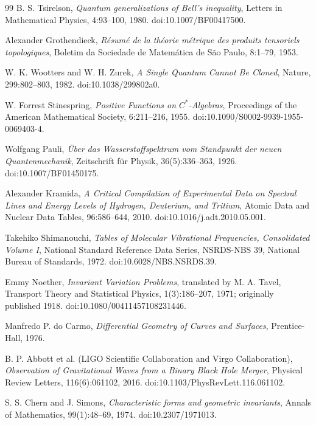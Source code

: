 \documentclass{article}
\begin{document}
\begin{thebibliography}{99}
B. S. Tsirelson,
\textit{Quantum generalizations of Bell's inequality},
Letters in Mathematical Physics, 4:93--100, 1980.
doi:10.1007/BF00417500.

Alexander Grothendieck,
\textit{R\'esum\'e de la th\'eorie m\'etrique des produits tensoriels topologiques},
Boletim da Sociedade de Matem\'atica de S\~ao Paulo, 8:1--79, 1953.

W. K. Wootters and W. H. Zurek,
\textit{A Single Quantum Cannot Be Cloned},
Nature, 299:802--803, 1982.
doi:10.1038/299802a0.

W. Forrest Stinespring,
\textit{Positive Functions on $C^*$-Algebras},
Proceedings of the American Mathematical Society, 6:211--216, 1955.
doi:10.1090/S0002-9939-1955-0069403-4.

Wolfgang Pauli,
\textit{\"Uber das Wasserstoffspektrum vom Standpunkt der neuen
Quantenmechanik},
Zeitschrift f\"ur Physik, 36(5):336--363, 1926.
doi:10.1007/BF01450175.

Alexander Kramida,
\textit{A Critical Compilation of Experimental Data on Spectral Lines and
Energy Levels of Hydrogen, Deuterium, and Tritium},
Atomic Data and Nuclear Data Tables, 96:586--644, 2010.
doi:10.1016/j.adt.2010.05.001.

Takehiko Shimanouchi,
\textit{Tables of Molecular Vibrational Frequencies, Consolidated Volume I},
National Standard Reference Data Series, NSRDS-NBS 39,
National Bureau of Standards, 1972.
doi:10.6028/NBS.NSRDS.39.

Emmy Noether,
\textit{Invariant Variation Problems},
translated by M. A. Tavel,
Transport Theory and Statistical Physics, 1(3):186--207, 1971;
originally published 1918.
doi:10.1080/00411457108231446.

Manfredo P. do Carmo,
\textit{Differential Geometry of Curves and Surfaces},
Prentice-Hall, 1976.

B. P. Abbott et al. (LIGO Scientific Collaboration and Virgo Collaboration),
\textit{Observation of Gravitational Waves from a Binary Black Hole Merger},
Physical Review Letters, 116(6):061102, 2016.
doi:10.1103/PhysRevLett.116.061102.

S. S. Chern and J. Simons,
\textit{Characteristic forms and geometric invariants},
Annals of Mathematics, 99(1):48--69, 1974.
doi:10.2307/1971013.


\end{thebibliography}
\end{document}
